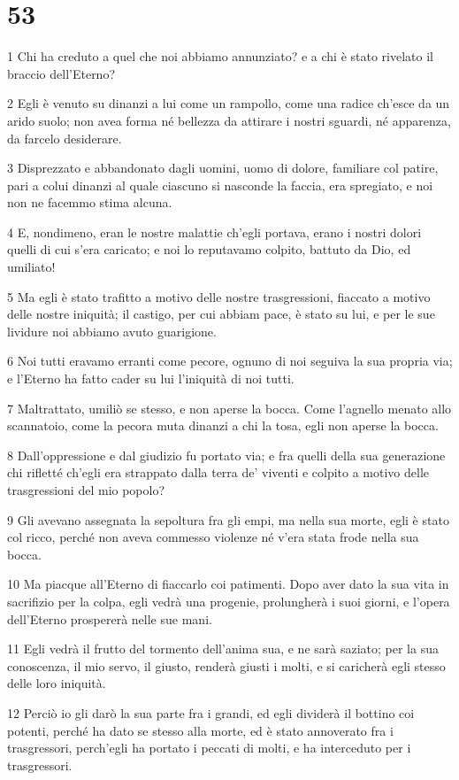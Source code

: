 \chapter{53}

\par 1 Chi ha creduto a quel che noi abbiamo annunziato? e a chi è stato rivelato il braccio dell'Eterno?
\par 2 Egli è venuto su dinanzi a lui come un rampollo, come una radice ch'esce da un arido suolo; non avea forma né bellezza da attirare i nostri sguardi, né apparenza, da farcelo desiderare.
\par 3 Disprezzato e abbandonato dagli uomini, uomo di dolore, familiare col patire, pari a colui dinanzi al quale ciascuno si nasconde la faccia, era spregiato, e noi non ne facemmo stima alcuna.
\par 4 E, nondimeno, eran le nostre malattie ch'egli portava, erano i nostri dolori quelli di cui s'era caricato; e noi lo reputavamo colpito, battuto da Dio, ed umiliato!
\par 5 Ma egli è stato trafitto a motivo delle nostre trasgressioni, fiaccato a motivo delle nostre iniquità; il castigo, per cui abbiam pace, è stato su lui, e per le sue lividure noi abbiamo avuto guarigione.
\par 6 Noi tutti eravamo erranti come pecore, ognuno di noi seguiva la sua propria via; e l'Eterno ha fatto cader su lui l'iniquità di noi tutti.
\par 7 Maltrattato, umiliò se stesso, e non aperse la bocca. Come l'agnello menato allo scannatoio, come la pecora muta dinanzi a chi la tosa, egli non aperse la bocca.
\par 8 Dall'oppressione e dal giudizio fu portato via; e fra quelli della sua generazione chi rifletté ch'egli era strappato dalla terra de' viventi e colpito a motivo delle trasgressioni del mio popolo?
\par 9 Gli avevano assegnata la sepoltura fra gli empi, ma nella sua morte, egli è stato col ricco, perché non aveva commesso violenze né v'era stata frode nella sua bocca.
\par 10 Ma piacque all'Eterno di fiaccarlo coi patimenti. Dopo aver dato la sua vita in sacrifizio per la colpa, egli vedrà una progenie, prolungherà i suoi giorni, e l'opera dell'Eterno prospererà nelle sue mani.
\par 11 Egli vedrà il frutto del tormento dell'anima sua, e ne sarà saziato; per la sua conoscenza, il mio servo, il giusto, renderà giusti i molti, e si caricherà egli stesso delle loro iniquità.
\par 12 Perciò io gli darò la sua parte fra i grandi, ed egli dividerà il bottino coi potenti, perché ha dato se stesso alla morte, ed è stato annoverato fra i trasgressori, perch'egli ha portato i peccati di molti, e ha interceduto per i trasgressori.


